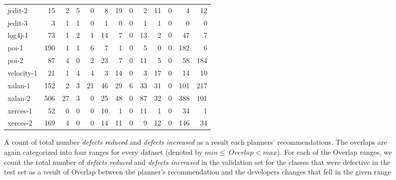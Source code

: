 \begin{figure}[!htbp]
{{\begin{tabular}{@{}l|rrr|rrr|rrr|rrr}
jedit-2    & 15  & \cellcolor{gr1}2  & \cellcolor{gr1}5 & 0  & \cellcolor{gr2}8  & 19 & 0 & \cellcolor{gr3}2  & 11 & 0 & \cellcolor{gr4}4   & 12  \bigstrut\\
jedit-3    & 3   & \cellcolor{gr1}1  & \cellcolor{gr1}1 & 0  & 1  & \cellcolor{gr2}0  & 0 & \cellcolor{gr3}1  & \cellcolor{gr3}1  & 0 & 0   & 0   \bigstrut\\ \hline
log4j-1    & 73  & \cellcolor{gr1}1  & \cellcolor{gr1}2 & 1  & 14 & \cellcolor{gr2}7  & 0 & 13 & \cellcolor{gr3}2  & 0 & 47  & \cellcolor{gr4}7   \bigstrut\\ \hline
poi-1      & 190 & \cellcolor{gr1}1  & \cellcolor{gr1}1 & 6  & 7  & \cellcolor{gr2}1  & 0 & 5  & \cellcolor{gr3}0  & 0 & 182 & \cellcolor{gr4}6   \bigstrut\\
poi-2      & 87  & 4  & \cellcolor{gr1}0 & 2  & 23 & \cellcolor{gr2}7  & 0 & 11 & \cellcolor{gr3}5  & 0 & \cellcolor{gr4}58  & 184 \bigstrut\\ \hline
velocity-1 & 21  & \cellcolor{gr1}1  & \cellcolor{gr1}4 & 4  & \cellcolor{gr2}3  & 14 & 0 & \cellcolor{gr3}3  & 17 & 0 & 14  & \cellcolor{gr4}10  \bigstrut\\ \hline
xalan-1    & 152 & \cellcolor{gr1}2  & \cellcolor{gr1}3 & 21 & 46 & \cellcolor{gr2}29 & 6 & 33 & \cellcolor{gr3}31 & 0 & \cellcolor{gr4}101 & 217 \bigstrut\\
xalan-2    & 506 & 27 & \cellcolor{gr1}3 & 0  & \cellcolor{gr2}25 & 48 & 0 & 87 & \cellcolor{gr3}32 & 0 & 388 & \cellcolor{gr4}101 \bigstrut\\ \hline
xerces-1   & 52  & \cellcolor{gr1}0  & \cellcolor{gr1}0 & 0  & 10 & \cellcolor{gr2}1  & 0 & 11 & \cellcolor{gr3}1  & 0 & \cellcolor{gr4}34  & 1   \bigstrut\\
xerces-2   & 169 & 4  & \cellcolor{gr1}0 & 0  & 14 & \cellcolor{gr2}11 & 0 & \cellcolor{gr3}9  & 12 & 0 & 146 & \cellcolor{gr4}34 
\end{tabular}}
\label{fig:rq3_inc}
}
\caption{A count of total number \textit{defects reduced} and \textit{defects increased} as a result each planners' recommendations. The overlaps are again categorized into four ranges for every dataset (denoted by $min\leq~Overlap<max$). For each of the Overlap ranges, we count the total number of \textit{defects reduced} and \textit{defects increased} in the validation set for the classes that were defective in the test set as a result of Overlap between the planner's recommendation and the developers changes that fell in the given range}
\label{fig:rq3}
\end{figure}